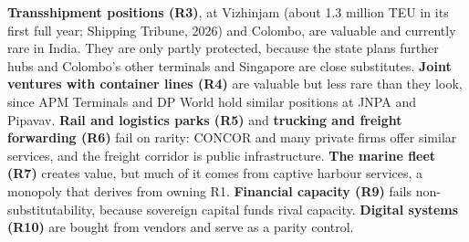 \documentclass[12pt, a4paper]{article}
\begin{document}
\textbf{Transshipment positions (R3)}, at Vizhinjam (about 1.3 million TEU in
its first full year; Shipping Tribune, 2026) and Colombo, are valuable and
currently rare in India. They are only partly protected, because the state
plans further hubs and Colombo's other terminals and Singapore are close
substitutes. \textbf{Joint ventures with container lines (R4)} are valuable but
less rare than they look, since APM Terminals and DP World hold similar
positions at JNPA and Pipavav. \textbf{Rail and logistics parks (R5)} and
\textbf{trucking and freight forwarding (R6)} fail on rarity: CONCOR and many
private firms offer similar services, and the freight corridor is public
infrastructure. \textbf{The marine fleet (R7)} creates value, but much of it
comes from captive harbour services, a monopoly that derives from owning R1.
\textbf{Financial capacity (R9)} fails non-substitutability, because sovereign
capital funds rival capacity. \textbf{Digital systems (R10)} are bought from
vendors and serve as a parity control.
\end{document}
